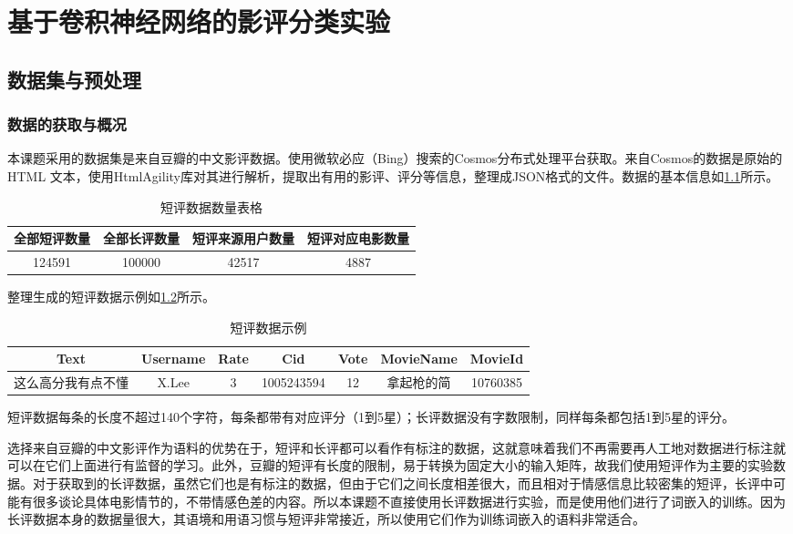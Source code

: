 \chapter{基于卷积神经网络的影评分类实验}
\section{数据集与预处理}
\subsection{数据的获取与概况}
本课题采用的数据集是来自豆瓣的中文影评数据。使用微软必应（Bing）搜索的Cosmos分布式处理平台获取。来自Cosmos的数据是原始的HTML 文本，使用HtmlAgility库对其进行解析，提取出有用的影评、评分等信息，整理成JSON格式的文件。数据的基本信息如\ref{tab:comment count}所示。

\begin{table}
\centering
\caption{短评数据数量表格} \label{tab:comment count}
\begin{tabular}{c|c|c|c}
    \hline
    全部短评数量 & 全部长评数量 & 短评来源用户数量 & 短评对应电影数量\\
    \hline
    124591 & 100000 & 42517 & 4887\\
    \hline
\end{tabular}
\end{table}

整理生成的短评数据示例如\ref{tab:comment format}所示。
\begin{table}
\centering
\caption{短评数据示例} \label{tab:comment format}
\begin{tabular}{c|c|c|c|c|c|c}
    \hline
    Text & Username & Rate & Cid & Vote & MovieName & MovieId\\
    \hline
    这么高分我有点不懂 & X.Lee & 3 & 1005243594 & 12 & 拿起枪的简 & 10760385\\
    \hline
\end{tabular}
\end{table}

短评数据每条的长度不超过140个字符，每条都带有对应评分（1到5星）；长评数据没有字数限制，同样每条都包括1到5星的评分。

选择来自豆瓣的中文影评作为语料的优势在于，短评和长评都可以看作有标注的数据，这就意味着我们不再需要再人工地对数据进行标注就可以在它们上面进行有监督的学习。此外，豆瓣的短评有长度的限制，易于转换为固定大小的输入矩阵，故我们使用短评作为主要的实验数据。对于获取到的长评数据，虽然它们也是有标注的数据，但由于它们之间长度相差很大，而且相对于情感信息比较密集的短评，长评中可能有很多谈论具体电影情节的，不带情感色差的内容。所以本课题不直接使用长评数据进行实验，而是使用他们进行了词嵌入的训练。因为长评数据本身的数据量很大，其语境和用语习惯与短评非常接近，所以使用它们作为训练词嵌入的语料非常适合。


